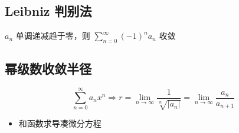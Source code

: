 \documentclass{ctexart}
\begin{document}
\subsection{Leibniz 判别法}

$a_n$ 单调递减趋于零，则 $\sum_{n = 0}^{\infty} (-1)^n a_n$ 收敛

\subsection{幂级数收敛半径}

\begin{equation}
    \sum_{n = 0}^{\infty} a_n x^n \Rightarrow r = \lim_{n \to \infty} \frac{1}{\sqrt[n]{|a_n|}} = \lim_{n \to \infty} \frac{a_n}{a_{n+1}}
\end{equation}

\begin{itemize}
    \item 和函数求导凑微分方程
\end{itemize}
\end{document}
